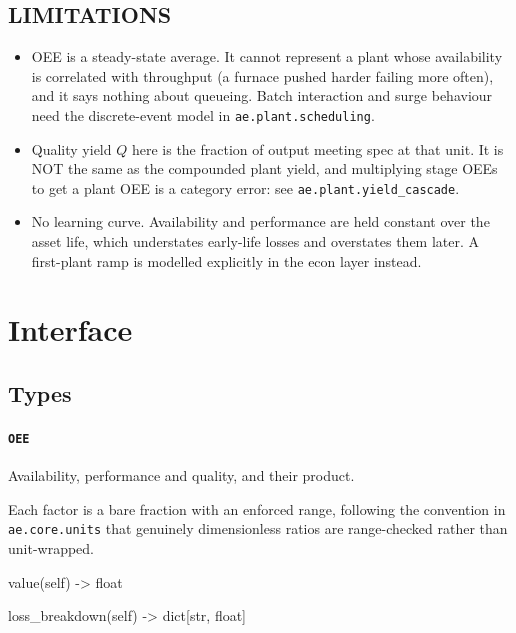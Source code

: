\documentclass[10pt,a4paper,twoside]{report}
\begin{document}
\subsection*{LIMITATIONS}

\begin{itemize}
\item OEE is a steady-state average. It cannot represent a plant whose availability is correlated with throughput (a furnace pushed harder failing more often), and it says nothing about queueing. Batch interaction and surge behaviour need the discrete-event model in \texttt{ae.plant.scheduling}.
\item Quality yield $Q$ here is the fraction of output meeting spec at that unit. It is NOT the same as the compounded plant yield, and multiplying stage OEEs to get a plant OEE is a category error: see \texttt{ae.plant.yield\_cascade}.
\item No learning curve. Availability and performance are held constant over the asset life, which understates early-life losses and overstates them later. A first-plant ramp is modelled explicitly in the econ layer instead.
\end{itemize}

\section{Interface}

\subsection*{Types}

\paragraph{\texttt{OEE}}

Availability, performance and quality, and their product.

Each factor is a bare fraction with an enforced range, following the convention in \texttt{ae.core.units} that genuinely dimensionless ratios are range-checked rather than unit-wrapped.

\begin{verbatimsmall}
value(self) -> float
\end{verbatimsmall}

\begin{verbatimsmall}
loss_breakdown(self) -> dict[str, float]
\end{verbatimsmall}
\end{document}

